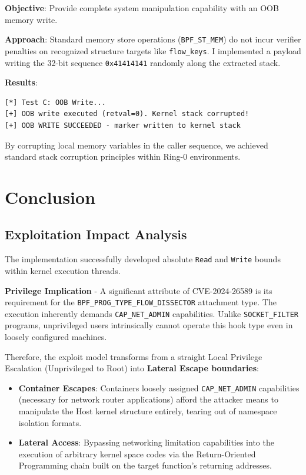 \textbf{Objective}: Provide complete system manipulation capability with an OOB memory write.

\textbf{Approach}: Standard memory store operations (\texttt{BPF\_ST\_MEM}) do not incur verifier penalties on recognized structure targets like \texttt{flow\_keys}. I implemented a payload writing the 32-bit sequence \texttt{0x41414141} randomly along the extracted stack. 

\textbf{Results}:
\begin{lstlisting}[style=log]
[*] Test C: OOB Write...
[+] OOB write executed (retval=0). Kernel stack corrupted!
[+] OOB WRITE SUCCEEDED - marker written to kernel stack
\end{lstlisting}

By corrupting local memory variables in the caller sequence, we achieved standard stack corruption principles within Ring-0 environments.

\section{Conclusion}

\subsection{Exploitation Impact Analysis}

The implementation successfully developed absolute \texttt{Read} and \texttt{Write} bounds within kernel execution threads. 

\textbf{Privilege Implication} - A significant attribute of CVE-2024-26589 is its requirement for the \texttt{BPF\_\allowbreak PROG\_\allowbreak TYPE\_\allowbreak FLOW\_\allowbreak DISSECTOR} attachment type. The execution inherently demands \texttt{CAP\_\allowbreak NET\_\allowbreak ADMIN} capabilities.
Unlike \texttt{SOCKET\_FILTER} programs, unprivileged users intrinsically cannot operate this hook type even in loosely configured machines.

Therefore, the exploit model transforms from a straight Local Privilege Escalation (Unprivileged to Root) into \textbf{Lateral Escape boundaries}:
\begin{itemize}
    \item \textbf{Container Escapes}: Containers loosely assigned \texttt{CAP\_NET\_ADMIN} capabilities (necessary for network router applications) afford the attacker means to manipulate the Host kernel structure entirely, tearing out of namespace isolation formats.
    \item \textbf{Lateral Access}: Bypassing networking limitation capabilities into the execution of arbitrary kernel space codes via the Return-Oriented Programming chain built on the target function's returning addresses.
\end{itemize}
